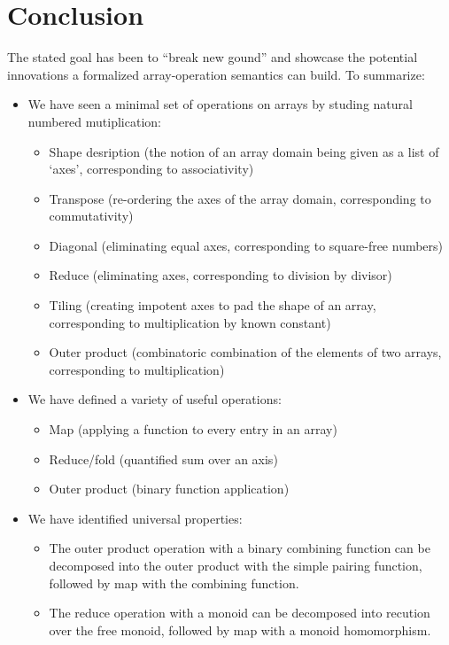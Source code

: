 \documentclass{DIKU-report-variant}
\begin{document}
\chapter{Conclusion}

The stated goal has been to ``break new gound'' and showcase the potential innovations
a formalized array-operation semantics can build. To summarize:

\begin{itemize}
  \item We have seen a minimal set of operations on arrays by studing natural
    numbered mutiplication:
    \begin{itemize}
      \item Shape desription (the notion of an array domain being given as a list of `axes', corresponding
        to associativity)
      \item Transpose (re-ordering the axes of the array domain, corresponding to commutativity)
      \item Diagonal (eliminating equal axes, corresponding to square-free numbers)
      \item Reduce (eliminating axes, corresponding to division by divisor)
      \item Tiling (creating impotent axes to pad the shape of an array, corresponding to multiplication
        by known constant)
      \item Outer product (combinatoric combination of the elements of two arrays, corresponding to
        multiplication)
    \end{itemize}
  \item We have defined a variety of useful operations:
    \begin{itemize}
      \item Map (applying a function to every entry in an array)
      \item Reduce/fold (quantified sum over an axis)
      \item Outer product (binary function application)
    \end{itemize}
  \item We have identified universal properties:
    \begin{itemize}
      \item The outer product operation with a binary combining function can be decomposed
        into the outer product with the simple pairing function, followed by map with the combining
        function.
      \item The reduce operation with a monoid can be decomposed into recution over the
        free monoid, followed by map with a monoid homomorphism.
    \end{itemize}
\end{itemize}
\end{document}
